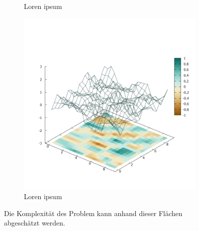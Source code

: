 \begin{figure}[ht!]
\begin{subfigure}[b]{0.3\textwidth}
          	\caption[Loren ipsum]{Loren ipsum}
         	\label{fig:Plate0_A2}
        \end{subfigure}
        \begin{subfigure}[b]{0.3\textwidth}
			\centering
			\includegraphics[width=\textwidth]{img/Plate0_A4.png}
			\caption[Loren ipsum]{Loren ipsum}
			\label{fig:Plate0_A4}
        \end{subfigure}
        \caption[Reale Messwerte visualisiert]{Die Komplexität des Problem kann anhand dieser Flächen abgeschätzt werden.}\label{fig:Real_Measurements}
\end{figure}
